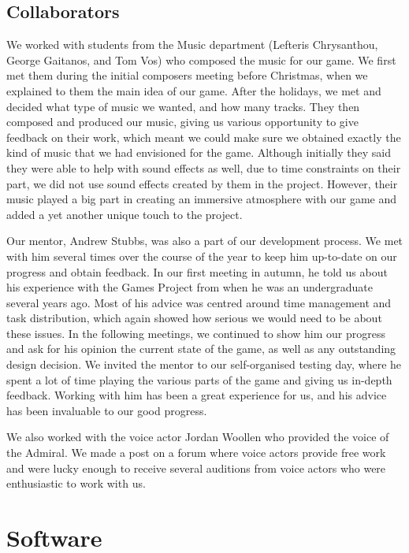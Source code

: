 \documentclass[a4paper,11pt]{article}
\begin{document}

\subsection{Collaborators}
We worked with students from the Music department (Lefteris Chrysanthou, George Gaitanos, and Tom Vos) who composed the music for our game. We first met them during the initial composers meeting before Christmas, when we explained to them the main idea of our game. After the holidays, we met and decided what type of music we wanted, and how many tracks. They then composed and produced our music, giving us various opportunity to give feedback on their work, which meant we could make sure we obtained exactly the kind of music that we had envisioned for the game. Although initially they said they were able to help with sound effects as well, due to time constraints on their part, we did not use sound effects created by them in the project. However, their music played a big part in creating an immersive atmosphere with our game and added a yet another unique touch to the project.

Our mentor, Andrew Stubbs, was also a part of our development process. We met with him several times over the course of the year to keep him up-to-date on our progress and obtain feedback. In our first meeting in autumn, he told us about his experience with the Games Project from when he was an undergraduate several years ago. Most of his advice was centred around time management and task distribution, which again showed how serious we would need to be about these issues. In the following meetings, we continued to show him our progress and ask for his opinion the current state of the game, as well as any outstanding design decision. We invited the mentor to our self-organised testing day, where he spent a lot of time playing the various parts of the game and giving us in-depth feedback. Working with him has been a great experience for us, and his advice has been invaluable to our good progress.

We also worked with the voice actor Jordan Woollen who provided the voice of the Admiral. We made a post on a forum where voice actors provide free work and were lucky enough to receive several auditions from voice actors who were enthusiastic to work with us.

\section{Software}
\end{document}
